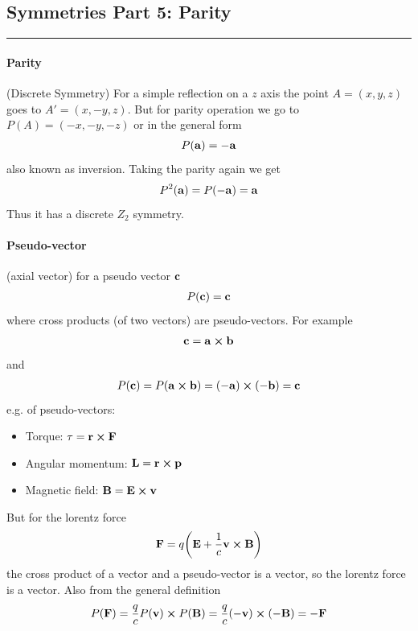 \documentclass[../main.tex]{subfiles}
\begin{document}
\newpage
{}
\subsection*{Symmetries Part 5: Parity}
\hrule \vspace{10px}

\paragraph*{Parity} (Discrete Symmetry) For a simple reflection on a $z$ axis
the point $A=(x, y, z)$ goes to $A' = (x, -y, z)$. But for parity operation we go to
$P(A) = (-x, -y, -z)$ or in the general form
\begin{align*}
    P(\vb{a}) = -\vb{a}
\end{align*}
also known as inversion. Taking the parity again we get
\begin{align*}
    P^2(\vb{a}) = P(-\vb{a}) = \vb{a}
\end{align*}
Thus it has a discrete $Z_2$ symmetry.

\paragraph*{Pseudo-vector} (axial vector) for a pseudo vector $\vb{c}$
\begin{align*}
    P(\vb{c}) = \vb{c}
\end{align*}
where cross products (of two vectors) are pseudo-vectors. For example
\begin{align*}
    \vb{c} = \vb{a} \cross \vb{b}
\end{align*}
and
\begin{align*}
    P(\vb{c}) = P(\vb{a} \cross \vb{b}) = (-\vb{a}) \cross (-\vb{b}) = \vb{c}
\end{align*}
e.g. of pseudo-vectors:
\begin{itemize}
    \item Torque: $\vb{\tau} = \vb{r} \cross \vb{F}$
    \item Angular momentum: $\vb{L} = \vb{r} \cross \vb{p}$
    \item Magnetic field: $\vb{B} = \vb{E} \cross \vb{v}$
\end{itemize}
But for the lorentz force 
\begin{align*}
    \vb{F} = q \qt(\vb{E} + \frac{1}{c} \vb{v} \cross \vb{B})
\end{align*}
the cross product of a vector and a pseudo-vector is a vector, so the lorentz force is a vector. 
Also from the general definition
\begin{align*}
    P(\vb{F}) = \frac{q}{c} P(\vb{v}) \cross P(\vb{B}) = \frac{q}{c} (-\vb{v}) \cross (-\vb{B}) = - \vb{F}
\end{align*}
\end{document}

